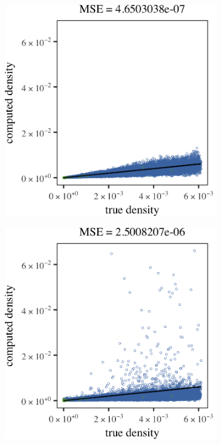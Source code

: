 	\begin{figure}[!ht]
		\centering
		\begin{subfigure}{0.6\columnwidth}
			\centering
			\includegraphics[width=\textwidth]{4/img/noOutliers/results_baakman_1_60000_mbe_silverman_no_outliers.png}
			\caption{\mbe}
			\label{fig:results:baakman1:noOutliers:mbe}
		\end{subfigure}
		\begin{subfigure}{0.6\columnwidth}
			\centering
			\includegraphics[width=\textwidth]{4/img/noOutliers/results_baakman_1_60000_sambe_silverman_no_outliers.png}

\end{subfigure}
\end{figure}
